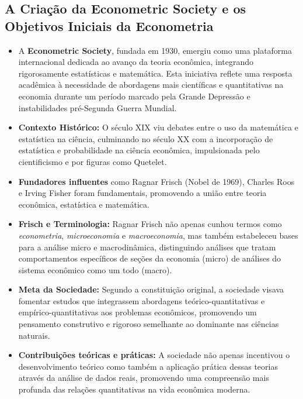 \documentclass[a4paper,12pt]{article}[abntex2]
\begin{document}
\subsection{A Criação da Econometric Society e os Objetivos Iniciais da Econometria}
\begin{itemize}
  \item A \textbf{Econometric Society}, fundada em 1930, emergiu como uma plataforma internacional dedicada ao avanço da teoria econômica, integrando rigorosamente estatísticas e matemática. Esta iniciativa reflete uma resposta acadêmica à necessidade de abordagens mais científicas e quantitativas na economia durante um período marcado pela Grande Depressão e instabilidades pré-Segunda Guerra Mundial.
  \item \textbf{Contexto Histórico:} O século XIX viu debates entre o uso da matemática e estatística na ciência, culminando no século XX com a incorporação de estatística e probabilidade na ciência econômica, impulsionada pelo cientificismo e por figuras como Quetelet.
  \item \textbf{Fundadores influentes} como Ragnar Frisch (Nobel de 1969), Charles Roos e Irving Fisher foram fundamentais, promovendo a união entre teoria econômica, estatística e matemática.
  \item \textbf{Frisch e Terminologia:} Ragnar Frisch não apenas cunhou termos como \textit{econometria}, \textit{microeconomia} e \textit{macroeconomia}, mas também estabeleceu bases para a análise micro e macrodinâmica, distinguindo análises que tratam comportamentos específicos de seções da economia (micro) de análises do sistema econômico como um todo (macro).
  \item \textbf{Meta da Sociedade:} Segundo a constituição original, a sociedade visava fomentar estudos que integrassem abordagens teórico-quantitativas e empírico-quantitativas aos problemas econômicos, promovendo um pensamento construtivo e rigoroso semelhante ao dominante nas ciências naturais.
  \item \textbf{Contribuições teóricas e práticas:} A sociedade não apenas incentivou o desenvolvimento teórico como também a aplicação prática dessas teorias através da análise de dados reais, promovendo uma compreensão mais profunda das relações quantitativas na vida econômica moderna.
\end{itemize}
\end{document}
